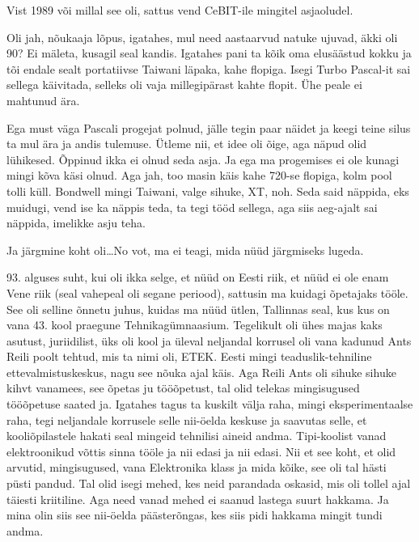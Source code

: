 Vist 1989 või millal see oli, sattus vend CeBIT-ile mingitel asjaoludel. 


Oli jah, nõukaaja lõpus, igatahes, mul need aastaarvud natuke ujuvad, äkki oli 90? Ei mäleta, kusagil seal kandis. Igatahes pani ta kõik oma elusäästud kokku ja tõi endale sealt portatiivse Taiwani läpaka, kahe flopiga. Isegi Turbo Pascal-it sai sellega käivitada, selleks oli vaja millegipärast kahte flopit. Ühe peale ei mahtunud ära. 

Ega must väga Pascali progejat polnud, jälle  tegin paar näidet  ja keegi teine silus ta mul ära ja andis tulemuse. Ütleme nii, et idee oli õige, aga  näpud olid lühikesed. Õppinud ikka ei olnud seda asja. Ja ega ma progemises ei ole kunagi mingi kõva käsi olnud. Aga jah, too masin käis kahe 720-se flopiga,  kolm pool tolli küll. Bondwell mingi Taiwani, valge sihuke, XT, noh. Seda said näppida, eks muidugi, vend ise ka näppis teda, ta tegi tööd sellega, aga siis aeg-ajalt sai näppida, imelikke asju teha. 

Ja järgmine koht oli\ldots No vot, ma ei teagi, mida nüüd järgmiseks lugeda. 

93. alguses suht, kui oli ikka selge, et nüüd on Eesti riik, et nüüd ei ole enam Vene riik (seal vahepeal oli segane periood), sattusin ma kuidagi õpetajaks tööle. See oli selline õnnetu juhus, kuidas ma nüüd ütlen, Tallinnas seal, kus kus on vana 43. kool praegune Tehnikagümnaasium\label{sisu:43kool}. Tegelikult oli ühes majas kaks asutust, juriidilist, üks oli kool ja  üleval neljandal korrusel oli vana kadunud Ants Reili poolt tehtud, mis ta nimi oli, ETEK. Eesti mingi teaduslik-tehniline ettevalmistuskeskus, nagu see nõuka ajal käis. Aga Reili Ants oli  sihuke sihuke kihvt vanamees, see õpetas ju tööõpetust, tal olid telekas mingisugused tööõpetuse saated ja. Igatahes  tagus ta kuskilt välja raha, mingi eksperimentaalse raha, tegi neljandale korrusele selle nii-öelda keskuse ja saavutas selle, et kooliõpilastele hakati seal mingeid tehnilisi aineid andma. Tipi-koolist vanad elektroonikud võttis sinna tööle ja nii edasi ja nii edasi. Nii et see koht, et olid arvutid, mingisugused, vana Elektronika klass ja mida kõike, see oli tal hästi püsti pandud. Tal olid isegi mehed, kes neid parandada oskasid, mis oli tollel ajal täiesti kriitiline. Aga need vanad mehed ei saanud lastega suurt hakkama. Ja mina olin siis see nii-öelda päästerõngas, kes siis pidi hakkama mingit tundi andma. 

